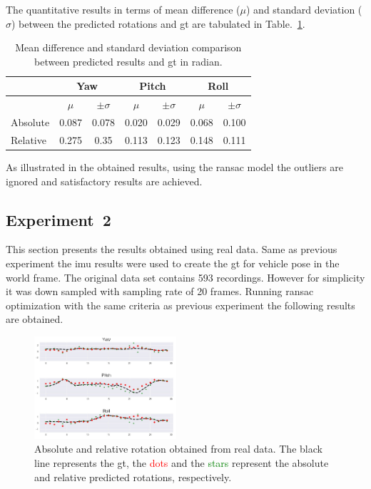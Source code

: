 The quantitative results in terms of mean difference ($\mu$) and standard
deviation ($\sigma$)
between the predicted rotations and \gls{gt} are tabulated in
Table.~\ref{tab:tab1}.

\begin{table}
  \centering
  \caption{Mean difference and standard deviation comparison between predicted
    results and \gls{gt} in radian.}
  \begin{tabular}{l cc cc cc}
    \toprule
    & \multicolumn{2}{c}{Yaw} & \multicolumn{2}{c}{Pitch} &
                                                            \multicolumn{2}{c}{Roll}\\
    \midrule
    & $\mu$ & $\pm \sigma$ &  $\mu$ & $\pm \sigma$ &  $\mu$ & $\pm \sigma$\\
    \cmidrule{2-3} \cmidrule{4-5} \cmidrule{6-7}

    Absolute & 0.087 & 0.078 & 0.020 & 0.029 & 0.068 & 0.100 \\
    Relative & 0.275 & 0.35 & 0.113 & 0.123 & 0.148 & 0.111\\
    \bottomrule
  \end{tabular}
  \label{tab:tab1}
\end{table}

As illustrated in the obtained results, using the ransac
model the outliers are ignored and satisfactory results are achieved.

\subsection{Experiment~2}
\label{sec:exp2}
This section presents the results obtained using real data. Same as previous
experiment the \gls{imu} results were used to create the \gls{gt} for vehicle
pose in the world frame.
The original data set contains 593 recordings. However for simplicity it was
down sampled with sampling rate of 20 frames.
Running ransac optimization with the same criteria as previous experiment the
following results are obtained.
\begin{figure}
  \includegraphics[width=0.47\textwidth]{./content/experiments/figures/real-ransac-abs-rel-2.jpg}
  \caption{Absolute and relative rotation obtained from real data. The black
    line represents the \gls{gt}, the \textcolor{red}{dots} and the
    \textcolor{green}{stars} represent the absolute and relative predicted
    rotations, respectively.}
  \label{fig:res-syn-ideal-abs-rel}
\end{figure}


